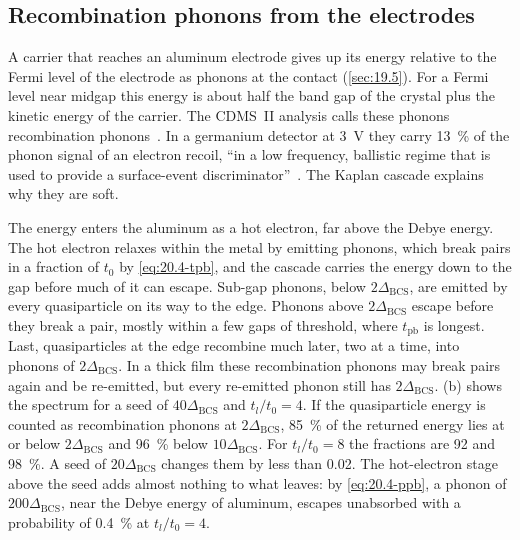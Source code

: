 \subsection{Recombination phonons from the electrodes}\label{sec:20.4-electrode}

A carrier that reaches an aluminum electrode gives up its energy relative to the Fermi level of the electrode as phonons at the contact (\cref{sec:19.5}). For a Fermi level near midgap this energy is about half the band gap of the crystal plus the kinetic energy of the carrier. The CDMS~II analysis calls these phonons recombination phonons~\cite[Sect.~2]{agnese2018nuclear}. In a germanium detector at \SI{3}{V} they carry \SI{13}{\percent} of the phonon signal of an electron recoil, ``in a low frequency, ballistic regime that is used to provide a surface-event discriminator''~\cite[p.~17]{leman2012invited}. The Kaplan cascade explains why they are soft.

The energy enters the aluminum as a hot electron, far above the Debye energy. The hot electron relaxes within the metal by emitting phonons, which break pairs in a fraction of $t_0$ by \cref{eq:20.4-tpb}, and the cascade carries the energy down to the gap before much of it can escape. Sub-gap phonons, below $2\Delta_{\mathrm{BCS}}$, are emitted by every quasiparticle on its way to the edge. Phonons above $2\Delta_{\mathrm{BCS}}$ escape before they break a pair, mostly within a few gaps of threshold, where $t_{\mathrm{pb}}$ is longest. Last, quasiparticles at the edge recombine much later, two at a time, into phonons of $2\Delta_{\mathrm{BCS}}$. In a thick film these recombination phonons may break pairs again and be re-emitted, but every re-emitted phonon still has $2\Delta_{\mathrm{BCS}}$. (b) shows the spectrum for a seed of $40\Delta_{\mathrm{BCS}}$ and $t_l/t_0 = 4$. If the quasiparticle energy is counted as recombination phonons at $2\Delta_{\mathrm{BCS}}$, \SI{85}{\percent} of the returned energy lies at or below $2\Delta_{\mathrm{BCS}}$ and \SI{96}{\percent} below $10\Delta_{\mathrm{BCS}}$. For $t_l/t_0 = 8$ the fractions are 92 and \SI{98}{\percent}. A seed of $20\Delta_{\mathrm{BCS}}$ changes them by less than 0.02. The hot-electron stage above the seed adds almost nothing to what leaves: by \cref{eq:20.4-ppb}, a phonon of $200\Delta_{\mathrm{BCS}}$, near the Debye energy of aluminum, escapes unabsorbed with a probability of \SI{0.4}{\percent} at $t_l/t_0 = 4$.

